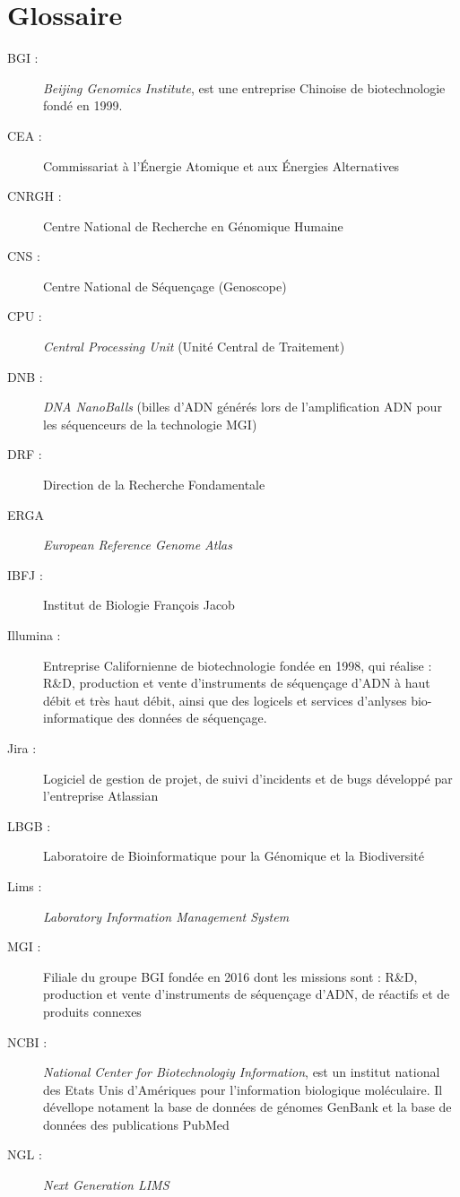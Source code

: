 \section*{Glossaire}

\begin{description}
    \item[BGI : ] \emph{Beijing Genomics Institute}, est une entreprise Chinoise de biotechnologie fondé en 1999.
    \item[CEA :] Commissariat à l'Énergie Atomique et aux Énergies Alternatives
    \item[CNRGH :] Centre National de Recherche en Génomique Humaine 
    \item[CNS :] Centre National de Séquençage (Genoscope)
    \item[CPU :] \emph{Central Processing Unit} (Unité Central de Traitement)
    \item[DNB :] \emph{DNA NanoBalls} (\og billes\fg{} d'ADN générés lors de l'amplification ADN pour les séquenceurs de la technologie MGI)
    \item[DRF :] Direction de la Recherche Fondamentale
    \item[ERGA] \emph{European Reference Genome Atlas}
    \item[IBFJ :] Institut de Biologie François Jacob
    \item[Illumina :] Entreprise Californienne de biotechnologie fondée en 1998, qui réalise : R\&D, production et vente d’instruments de séquençage d’ADN à haut débit et très haut débit, ainsi que des logicels et services d'anlyses bio-informatique des données de séquençage.
    \item[Jira :] Logiciel de gestion de projet, de suivi d'incidents et de bugs développé par l'entreprise Atlassian
    \item[LBGB :] Laboratoire de Bioinformatique pour la Génomique et la Biodiversité
    \item[Lims :] \emph{Laboratory Information Management System}
    \item[MGI : ] Filiale du groupe BGI fondée en 2016 dont les missions sont : R\&D, production et vente d’instruments de séquençage 
    d’ADN, de réactifs et de produits connexes
    \item[NCBI :] \emph{National Center for Biotechnologiy Information}, est un institut national des Etats Unis d'Amériques pour l'information biologique moléculaire. Il dévellope notament la base de données de génomes GenBank et la base de données des publications PubMed
    \item[NGL :] \emph{Next Generation LIMS}

\end{description}
